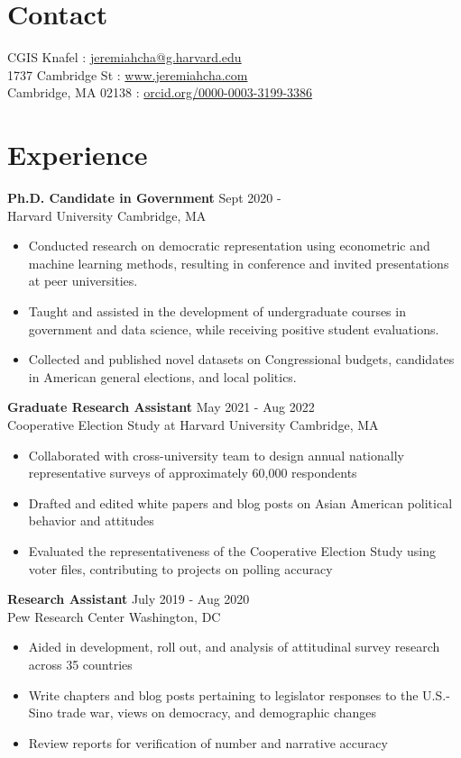 \documentclass[margin, line]{res}
\begin{document}
\begin{resume}

\section{Contact}
CGIS Knafel \hfill \Letter: \href{mailto:jeremiahcha@g.harvard.edu}{jeremiahcha@g.harvard.edu}\\
1737 Cambridge St \hfill \Mundus: \href{httsp://www.jeremiahcha.com}{www.jeremiahcha.com}\\
Cambridge, MA 02138 \hfill \Mundus: \href{https://orcid.org/0000-0003-3199-3386}{orcid.org/0000-0003-3199-3386}

\section{Experience}
\textbf{Ph.D. Candidate in Government} \hfill Sept 2020 - \\
Harvard University \hfill Cambridge, MA
\begin{itemize}
	\item Conducted research on democratic representation using econometric and machine learning methods, resulting in conference and invited presentations at peer universities.
	\item Taught and assisted in the development of undergraduate courses in government and data science, while receiving positive student evaluations.
	\item Collected and published novel datasets on Congressional budgets, candidates in American general elections, and local politics.
\end{itemize}

\textbf{Graduate Research Assistant} \hfill May 2021 - Aug 2022 \\
Cooperative Election Study at Harvard University \hfill Cambridge, MA
\begin{itemize}
	\item Collaborated with cross-university team to design annual nationally representative surveys of approximately 60,000 respondents
	\item Drafted and edited white papers and blog posts on Asian American political behavior and attitudes 
	\item Evaluated the representativeness of the Cooperative Election Study using voter files, contributing to projects on polling accuracy  
\end{itemize}

\textbf{Research Assistant} \hfill July 2019 - Aug 2020 \\
Pew Research Center \hfill Washington, DC
\begin{itemize}
	\item Aided in development, roll out, and analysis of attitudinal survey research across 35 countries
	\item Write chapters and blog posts pertaining to legislator responses to the U.S.-Sino trade war, views on democracy, and demographic changes 
	\item Review reports for verification of number and narrative accuracy  
\end{itemize}


\end{resume}
\end{document}
